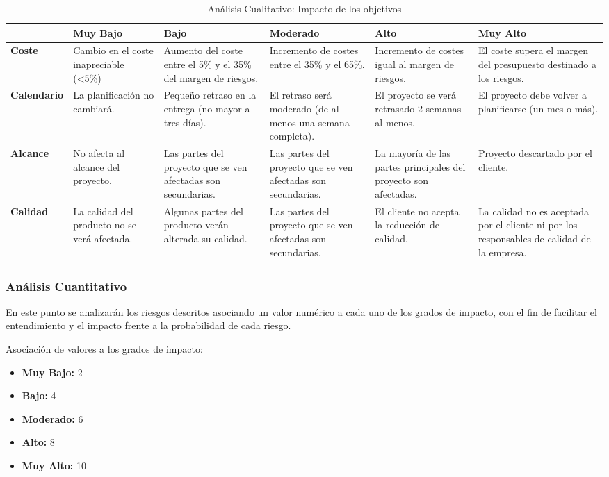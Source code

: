 \begin{table}[H]
\begin{center}
\begin{tabular}{p{2cm}|p{2.5cm} p{2.5cm} p{2.5cm} p{2.5cm} p{2.5cm}}
   & \textbf{Muy Bajo} & \textbf{Bajo} & \textbf{Moderado} & \textbf{Alto} & \textbf{Muy Alto}\\
\hline \hline
\textbf{Coste} & Cambio en el coste inapreciable (<5\%) & Aumento del coste entre el 5\% y el 35\% del margen de riesgos.& Incremento de costes entre el 35\% y el 65\%.& Incremento de costes igual al margen de riesgos.&El coste supera el margen del presupuesto destinado a los riesgos. \\
\hline
\textbf{Calendario} & La planificación no cambiará.& Pequeño retraso en la entrega (no mayor a tres días).&El retraso será moderado (de al menos una semana completa). & El proyecto se verá retrasado 2 semanas al menos.& El proyecto debe volver a planificarse (un mes o más).\\
\hline
\textbf{Alcance} & No afecta al alcance del proyecto.& Las partes del proyecto que se ven afectadas son secundarias.& Las partes del proyecto que se ven afectadas son secundarias.&La mayoría de las partes principales del proyecto son afectadas. & Proyecto descartado por el cliente.\\
\hline
\textbf{Calidad} & La calidad del producto no se verá afectada.& Algunas partes del producto verán alterada su calidad.& Las partes del proyecto que se ven afectadas son secundarias.& El cliente no acepta la reducción de calidad.& La calidad no es aceptada por el cliente ni por los responsables de calidad de  la empresa. \\
\hline
\end{tabular}
\caption{Análisis Cualitativo: Impacto de los objetivos}
\label{tab:analisis-cualitativo}
\end{center}
\end{table}


\subsubsection{Análisis Cuantitativo}
\par En este punto se analizarán los riesgos descritos asociando un valor numérico a cada uno de los grados de impacto, con el fin de facilitar el entendimiento y el impacto frente a la probabilidad de cada riesgo.
\par Asociación de valores a los grados de impacto:
\begin{itemize}[-]
  \item \textbf{Muy Bajo:} 2
  \item \textbf{Bajo:} 4
  \item \textbf{Moderado:} 6
  \item \textbf{Alto:} 8
  \item \textbf{Muy Alto:} 10
\end{itemize}

